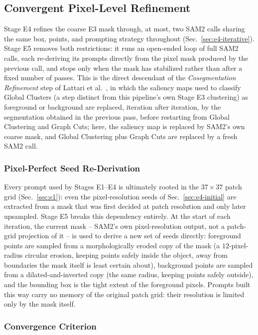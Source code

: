 \subsection{Convergent Pixel-Level Refinement}
\label{sec:e5}

Stage E4 refines the coarse E3 mask through, at most, two SAM2 calls
sharing the same box, points, and prompting strategy throughout
(Sec.~\ref{sec:e4-iterative}). Stage E5 removes both restrictions: it
runs an open-ended loop of full SAM2 calls, each re-deriving its
prompts directly from the pixel mask produced by the previous call,
and stops only when the mask has stabilized rather than after a fixed
number of passes. This is the direct descendant of the \emph{Cosegmentation Refinement} step of Lattari et al.~\cite{lattari2015}, in which the saliency maps used to classify Global Clusters (a step distinct from this pipeline's own Stage E3 clustering) as foreground or background are replaced, iteration after iteration, by the segmentation obtained in the previous pass, before restarting from Global Clustering and Graph Cuts; here, the saliency map is replaced by SAM2's own coarse mask, and Global Clustering plus Graph Cuts are replaced by a fresh SAM2 call.

\subsubsection{Pixel-Perfect Seed Re-Derivation}
\label{sec:e5-seeds}

Every prompt used by Stages E1--E4 is ultimately rooted in the
$37{\times}37$ patch grid (Sec.~\ref{sec:e1}): even the pixel-resolution
seeds of Sec.~\ref{sec:e4-initial} are extracted from a mask that was
first decided at patch resolution and only later upsampled. Stage E5
breaks this dependency entirely. At the start of each iteration, the
current mask -- SAM2's own pixel-resolution output, not a patch-grid
projection of it -- is used to derive a new set of seeds directly:
foreground points are sampled from a morphologically eroded copy of
the mask (a $12$-pixel-radius circular erosion, keeping points safely
inside the object, away from boundaries the mask itself is least
certain about), background points are sampled from a dilated-and-inverted copy (the same radius, keeping points safely outside), and the bounding box is the tight extent of the foreground pixels. Prompts built this way carry no memory of the original patch grid: their resolution is limited only by the mask itself.

\subsubsection{Convergence Criterion}
\label{sec:e5-convergence}

